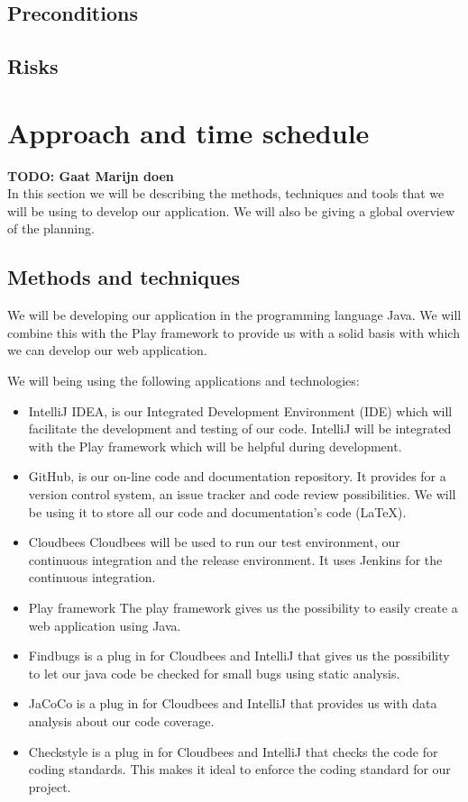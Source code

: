 \documentclass[]{article}
\newcommand{\TODO}[1]{{\color{red}\textbf{TODO: #1}}}
\begin{document}
\subsection{Preconditions}

\subsection{Risks}

\section{Approach and time schedule}
\TODO{Gaat Marijn doen}\\
In this section we will be describing the methods, techniques and tools that we will be using to develop our application. We will also be giving a global overview of the planning.

\subsection{Methods and techniques}
We will be developing our application in the programming language Java. We will combine this with the Play framework to provide us with a solid basis with which we can develop our web application.

We will being using the following applications and technologies:
\begin{itemize}
\item IntelliJ IDEA, is our Integrated Development Environment (IDE) which will facilitate the development and testing of our code.
IntelliJ will be integrated with the Play framework which will be helpful during development.
\item GitHub, is our on-line code and documentation repository.
It provides for a version control system, an issue tracker and code review possibilities.
We will be using it to store all our code and documentation's code (LaTeX).
\item Cloudbees
Cloudbees will be used to run our test environment, our continuous integration and the release environment.
It uses Jenkins for the continuous integration.
\item Play framework
The play framework gives us the possibility to easily create a web application using Java.
\item Findbugs is a plug in for Cloudbees and IntelliJ that gives us the possibility to let our java code be checked for small bugs using static analysis.
\item JaCoCo is a plug in for Cloudbees and IntelliJ that provides us with data analysis about our code coverage.
\item Checkstyle is a plug in for Cloudbees and IntelliJ that checks the code for coding standards.
This makes it ideal to enforce the coding standard for our project.
\end{itemize}
\end{document}
